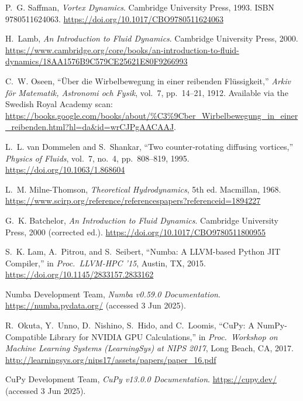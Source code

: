 \documentclass[12pt,letterpaper]{article}
\begin{document}
\begin{thebibliography}{99}

P.~G. Saffman,
\textit{Vortex Dynamics}.
Cambridge University Press, 1993. ISBN 9780511624063.  
\url{https://doi.org/10.1017/CBO9780511624063}

H.~Lamb,
\textit{An Introduction to Fluid Dynamics}.
Cambridge University Press, 2000.
\url{https://www.cambridge.org/core/books/an-introduction-to-fluid-dynamics/18AA1576B9C579CE25621E80F9266993}

C.~W. Oseen,
``Über die Wirbelbewegung in einer reibenden Flüssigkeit,''  
\textit{Arkiv för Matematik, Astronomi och Fysik}, vol.~7, pp.~14–21, 1912.  
Available via the Swedish Royal Academy scan:  
\url{https://books.google.com/books/about/%C3%9Cber_Wirbelbewegung_in_einer_reibenden.html?hl=da&id=wrCJPgAACAAJ}.

L.~L. van Dommelen and S.~Shankar,
``Two counter‐rotating diffusing vortices,''
\textit{Physics of Fluids}, vol.~7, no.~4, pp.~808–819, 1995.
\url{https://doi.org/10.1063/1.868604}

L.~M. Milne-Thomson,
\textit{Theoretical Hydrodynamics}, 5th ed.
Macmillan, 1968.  
\url{https://www.scirp.org/reference/referencespapers?referenceid=1894227}

G.~K. Batchelor,
\textit{An Introduction to Fluid Dynamics}.
Cambridge University Press, 2000 (corrected ed.).  
\url{https://doi.org/10.1017/CBO9780511800955}

S.~K. Lam, A.~Pitrou, and S.~Seibert,
``Numba: A LLVM-based Python JIT Compiler,''  
in \textit{Proc.\ LLVM-HPC ’15}, Austin, TX, 2015.  
\url{https://doi.org/10.1145/2833157.2833162}

Numba Development Team,
\textit{Numba v0.59.0 Documentation}.  
\url{https://numba.pydata.org/} (accessed 3 Jun 2025).

R.~Okuta, Y.~Unno, D.~Nishino, S.~Hido, and C.~Loomis,
``CuPy: A NumPy-Compatible Library for NVIDIA GPU Calculations,''  
in \textit{Proc.\ Workshop on Machine Learning Systems (LearningSys) at NIPS 2017}, Long Beach, CA, 2017.  
\url{http://learningsys.org/nips17/assets/papers/paper_16.pdf}

CuPy Development Team,
\textit{CuPy v13.0.0 Documentation}.  
\url{https://cupy.dev/} (accessed 3 Jun 2025).

\end{thebibliography}

\thispagestyle{ack_footer}
\end{document}
